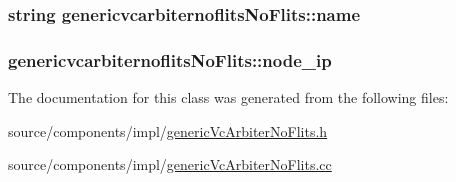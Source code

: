 \hypertarget{classgenericvcarbiternoflitsNoFlits_9f7e29c9d9d8568b3178082ed6c76f4e}{
\subsubsection[{name}]{\setlength{\rightskip}{0pt plus 5cm}string {\bf genericvcarbiternoflitsNoFlits::name}}}
\label{classgenericvcarbiternoflitsNoFlits_9f7e29c9d9d8568b3178082ed6c76f4e}


\hypertarget{classgenericvcarbiternoflitsNoFlits_17c531b8bb9df1098347bdfdf50f8bc9}{
\subsubsection[{node\_\-ip}]{ {\bf genericvcarbiternoflitsNoFlits::node\_\-ip}}}
\label{classgenericvcarbiternoflitsNoFlits_17c531b8bb9df1098347bdfdf50f8bc9}




The documentation for this class was generated from the following files:\begin{CompactItemize}
\item 
source/components/impl/\hyperlink{genericVcArbiterNoFlits_8h}{genericVcArbiterNoFlits.h}\item 
source/components/impl/\hyperlink{genericVcArbiterNoFlits_8cc}{genericVcArbiterNoFlits.cc}\end{CompactItemize}
